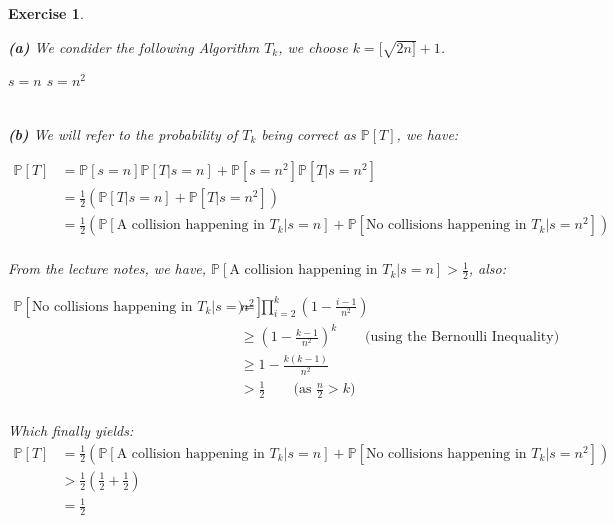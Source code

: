 \documentclass{article}
\newtheorem{exo}{Exercise}
\def\P{\mathbb{P}}
\begin{document}
\begin{exo}{\ \\}


\noindent 
\textbf{(a)} We condider the following Algorithm $T_k$, we choose $k = [\sqrt{2n]} + 1$. \\



\begin{algorithmic}[1]
\State {}
    \State \Return $s=n$
\EndIf
\State \Return $s = n^2$
\end{algorithmic}

\noindent
\\\textbf{(b)} We will refer to the probability of $T_k$ being correct as $\P[T]$, we have: 

\begin{align*}
    \P[T] 
    &= \P[s=n]\P[T|s=n] + \P[s=n^2]\P[T|s=n^2] \\
    &= \frac{1}{2} (\P[T|s=n] + \P[T|s=n^2]) \\
    &= \frac{1}{2} (\P[\text{A collision happening in $T_k$}|s=n] 
    + \P[\text{No collisions happening in $T_k$}|s=n^2]) \\
\end{align*}

From the lecture notes, we have, $\P[\text{A collision happening in $T_k$}|s=n] > \frac{1}{2}$, also:

\begin{align*}
    \P[\text{No collisions happening in $T_k$}|s=n^2]) 
    &= \prod_{i=2}^{k} (1-\frac{i-1}{n^2})  \\
    &\geq (1-\frac{k-1}{n^2})^k 
    \quad \quad \text{(using the Bernoulli Inequality)}\\
    &\geq 1 - \frac{k(k-1)}{n^2} \\
    &> \frac{1}{2}
    \quad \quad \text{(as $\frac{n}{2} > k)$}\\
\end{align*}

Which finally yields:
\begin{align*}
    \P[T] 
    &= \frac{1}{2} (\P[\text{A collision happening in $T_k$}|s=n] 
    + \P[\text{No collisions happening in $T_k$}|s=n^2]) \\
    &> \frac{1}{2}(\frac{1}{2} + \frac{1}{2} ) \\
    &= \frac{1}{2}
\end{align*}

\newpage
\end{exo}
\end{document}
